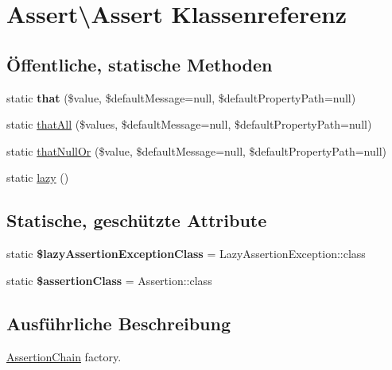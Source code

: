 \hypertarget{class_assert_1_1_assert}{}\section{Assert\textbackslash{}Assert Klassenreferenz}
\label{class_assert_1_1_assert}
\subsection*{Öffentliche, statische Methoden}
\begin{DoxyCompactItemize}
\item 
\mbox{\label{class_assert_1_1_assert_ad797cd56277739d7b26e70ea83fa8231}} 
static {\bfseries that} (\$value, \$default\+Message=null, \$default\+Property\+Path=null)
\item 
static \mbox{\hyperlink{class_assert_1_1_assert_a699aef30afb1fbc83d2ddf21e0342c8f}{that\+All}} (\$values, \$default\+Message=null, \$default\+Property\+Path=null)
\item 
static \mbox{\hyperlink{class_assert_1_1_assert_a935391510a9e75913abbd1811d391478}{that\+Null\+Or}} (\$value, \$default\+Message=null, \$default\+Property\+Path=null)
\item 
static \mbox{\hyperlink{class_assert_1_1_assert_a265a6a9fcb274b0f93bc3cc2b28e3ebc}{lazy}} ()
\end{DoxyCompactItemize}
\subsection*{Statische, geschützte Attribute}
\begin{DoxyCompactItemize}
\item 
\mbox{\label{class_assert_1_1_assert_a059806abee0ea9d3a64b992ef1eff1f0}} 
static {\bfseries \$lazy\+Assertion\+Exception\+Class} = Lazy\+Assertion\+Exception\+::class
\item 
\mbox{\label{class_assert_1_1_assert_ac48f7bd59a771339bfa6df3443f57aa4}} 
static {\bfseries \$assertion\+Class} = Assertion\+::class
\end{DoxyCompactItemize}


\subsection{Ausführliche Beschreibung}
\mbox{\hyperlink{class_assert_1_1_assertion_chain}{Assertion\+Chain}} factory. 

